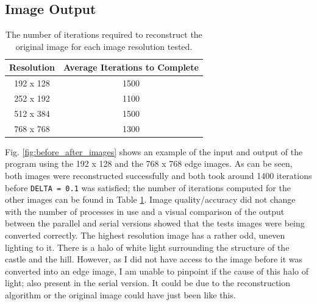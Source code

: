 \documentclass[11pt, a4paper]{article}
\begin{document}
		\subsection{Image Output}
			\begin{table}[h]
				\centering
				\begin{tabular}{|c|c|}
					\hline
					\textbf{Resolution} & \textbf{Average Iterations to Complete} \\ \hline
					192 x 128           & 1500                                    \\
					252 x 192           & 1100                                    \\
					512 x 384           & 1500                                    \\
					768 x 768           & 1300                                    \\ \hline
				\end{tabular}
				\caption{The number of iterations required to reconstruct the original image for each image resolution tested.}
				\label{tab:iterations}
			\end{table}
		
			Fig. \ref{fig:before_after_images} shows an example of the input and output of the program using the 192 x 128 and the 768 x 768 edge images. As can be seen, both images were reconstructed successfully and both took around 1400 iterations before \texttt{DELTA = 0.1} was satisfied; the number of iterations computed for the other images can be found in Table \ref{tab:iterations}. Image quality/accuracy did not change with the number of processes in use and a visual comparison of the output between the parallel and serial versions showed that the tests images were being converted correctly. The highest resolution image has a rather odd, uneven lighting to it. There is a halo of white light surrounding the structure of the castle and the hill. However, as I did not have access to the image before it was converted into an edge image, I am unable to pinpoint if the cause of this halo of light; also present in the serial version. It could be due to the reconstruction algorithm or the original image could have just been like this.
					
\end{document}
